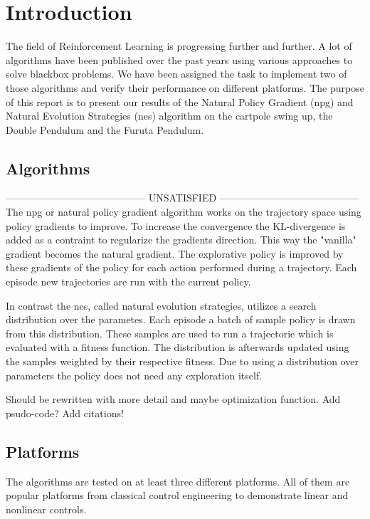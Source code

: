 \section{Introduction}
\label{intro}
The field of Reinforcement Learning is progressing further and further. A lot of algorithms have been published over the past years using various approaches to solve blackbox problems. We have been assigned the task to implement two of those algorithms and verify their performance on different platforms. The purpose of this report is to present our results of the Natural Policy Gradient (npg) and Natural Evolution Strategies (nes) algorithm on the cartpole swing up, the Double Pendulum and the Furuta Pendulum.

\subsection{Algorithms}
\label{algos}
------------------------------------------ UNSATISFIED ------------------------------------------
The npg or natural policy gradient algorithm works on the trajectory space using policy gradients to improve. To increase the convergence the KL-divergence is added as a contraint to regularize the gradients direction. This way the "vanilla" gradient becomes the natural gradient. The explorative policy is improved by these gradients of the policy for each action performed during a trajectory. Each episode new trajectories are run with the current policy.

In contrast the nes, called natural evolution strategies, utilizes a search distribution over the parametes. Each episode a batch of sample policy is drawn from this distribution. These samples are used to run a trajectorie which is evaluated with a fitness function. The distribution is afterwards updated using the samples weighted by their respective fitness. Due to using a distribution over parameters the policy does not need any exploration itself.

Should be rewritten with more detail and maybe optimization function. Add psudo-code? Add citations!

\subsection{Platforms}
\label{plats}
The algorithms are tested on at least three different platforms. All of them are popular platforms from classical control engineering to demonstrate linear and nonlinear controls.

